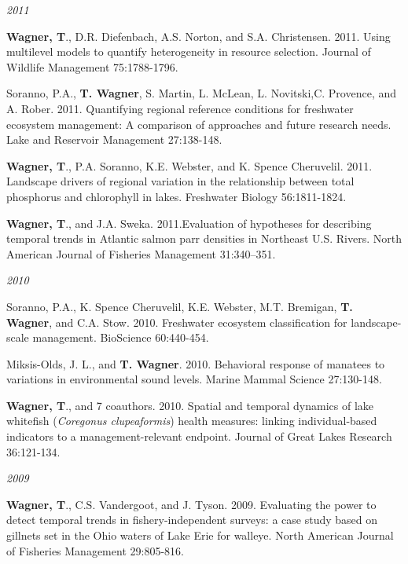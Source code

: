 \documentclass[10pt]{article}
\begin{document}
\begin{flushleft}
\begin{etaremune}[start=24]
\end{etaremune}
\emph{2011}
\begin{etaremune}[start=22]
\item {\bf Wagner, T}., D.R. Diefenbach, A.S. Norton, and S.A. Christensen. 2011. Using multilevel models to quantify heterogeneity in resource selection. Journal of Wildlife Management 75:1788-1796. 

\item Soranno, P.A., {\bf T. Wagner}, S. Martin, L. McLean, L. Novitski,C. Provence, and A. Rober. 2011. Quantifying regional reference conditions for freshwater ecosystem management: A comparison of approaches and future research needs. Lake and Reservoir Management 27:138-148. 

\item {\bf Wagner, T}., P.A. Soranno, K.E. Webster, and K. Spence Cheruvelil. 2011. Landscape drivers of regional variation in the relationship between total phosphorus and chlorophyll in lakes. Freshwater Biology 56:1811-1824.

\item {\bf Wagner, T}., and J.A. Sweka. 2011.Evaluation of hypotheses for describing temporal trends in Atlantic salmon parr densities in Northeast U.S. Rivers. North American Journal of Fisheries Management 31:340–351. 

\end{etaremune}
\emph{2010}
\begin{etaremune}[start=18]
\item Soranno, P.A., K. Spence Cheruvelil, K.E. Webster, M.T. Bremigan, {\bf T. Wagner}, and C.A. Stow. 2010. Freshwater ecosystem classification for landscape-scale management. BioScience 60:440-454.

\item Miksis-Olds, J. L., and {\bf T. Wagner}. 2010. Behavioral response of manatees to variations in environmental sound levels. Marine Mammal Science 27:130-148.

\item {\bf Wagner, T}., and 7 coauthors. 2010. Spatial and temporal dynamics of lake whitefish (\emph{Coregonus clupeaformis}) health measures: linking individual-based indicators to a management-relevant endpoint. Journal of Great Lakes Research 36:121-134.

\end{etaremune}
\emph{2009}
\begin{etaremune}[start=15]
\item {\bf Wagner, T}., C.S. Vandergoot, and J. Tyson. 2009. Evaluating the power to detect temporal trends in fishery-independent surveys: a case study based on gillnets set in the Ohio waters of Lake Erie for walleye. North American Journal of Fisheries Management 29:805-816.


\end{etaremune}
\end{flushleft}
\end{document}
